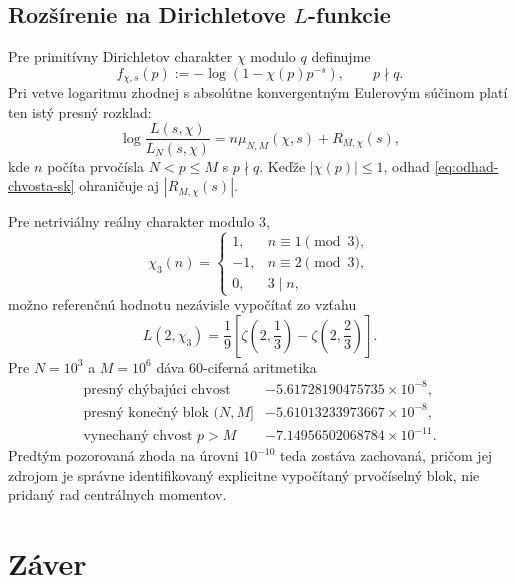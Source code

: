 \documentclass[11pt,a4paper]{article}
\begin{document}
\subsection{Rozšírenie na Dirichletove \texorpdfstring{\(L\)}{L}-funkcie}

Pre primitívny Dirichletov charakter \(\chi\) modulo \(q\) definujme
\[
  f_{\chi,s}(p):=-\log(1-\chi(p)p^{-s}),\qquad p\nmid q.
\]
Pri vetve logaritmu zhodnej s absolútne konvergentným Eulerovým súčinom
platí ten istý presný rozklad:
\begin{equation}\label{eq:L-chvost-sk}
  \log\frac{L(s,\chi)}{L_N(s,\chi)}
  =
  n\mu_{N,M}(\chi,s)+R_{M,\chi}(s),
\end{equation}
kde \(n\) počíta prvočísla \(N<p\le M\) s \(p\nmid q\). Keďže
\(|\chi(p)|\le1\), odhad \eqref{eq:odhad-chvosta-sk} ohraničuje aj
\(|R_{M,\chi}(s)|\).

Pre netriviálny reálny charakter modulo \(3\),
\[
  \chi_3(n)=
  \begin{cases}
    1,&n\equiv1\pmod3,\\
   -1,&n\equiv2\pmod3,\\
    0,&3\mid n,
  \end{cases}
\]
možno referenčnú hodnotu nezávisle vypočítať zo vzťahu
\[
  L(2,\chi_3)
  =\frac1{9}
   \left[\zeta\!\left(2,\frac13\right)
        -\zeta\!\left(2,\frac23\right)\right].
\]
Pre \(N=10^3\) a \(M=10^6\) dáva 60-ciferná aritmetika
\[
\begin{array}{lr}
\text{presný chýbajúci chvost} & -5.61728190475735\times10^{-8},\\
\text{presný konečný blok }(N,M] & -5.61013233973667\times10^{-8},\\
\text{vynechaný chvost }p>M & -7.14956502068784\times10^{-11}.
\end{array}
\]
Predtým pozorovaná zhoda na úrovni \(10^{-10}\) teda zostáva zachovaná,
pričom jej zdrojom je správne identifikovaný explicitne vypočítaný
prvočíselný blok, nie pridaný rad centrálnych momentov.

\section{Záver}
\end{document}
